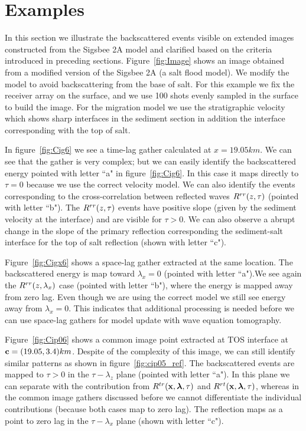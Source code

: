 \section{Examples}

In this section we illustrate the backscattered events visible on extended images constructed from the Sigsbee 2A model
and clarified based on the criteria introduced in preceding sections. Figure~\ref{fig:Image} shows an image obtained from  a modified
version of the Sigsbee 2A (a salt flood model). We modify the model to avoid backscattering from the base 
of salt. For this example we fix the receiver array on the surface, and we use 100 shots evenly sampled in the surface to build 
the image. For the migration model we use the stratigraphic
velocity which shows sharp interfaces in the sediment section in addition the interface corresponding with the top of salt.

In figure~\ref{fig:Cig6} we see a time-lag gather calculated at $x=19.05km$.
We can see that the gather is very complex; but we can easily identify the backscattered energy pointed with letter ``a" in figure~\ref{fig:Cig6}.
 In this case it maps directly to $\tau=0$ because we use the correct velocity model.
We can also identify the events corresponding to the cross-correlation between reflected waves $R^{rr}(z,\tau)$ (pointed
with letter ``b"). The $R^{rr}(z,\tau)$ events have positive slope (given by the sediment velocity at the interface) and are 
visible for $\tau>0$. We can also observe a abrupt change
in the slope of the primary reflection corresponding the sediment-salt interface for the top of salt reflection (shown with
letter ``c").

Figure~\ref{fig:Cigx6} shows a space-lag gather extracted at the same location. The backscattered energy is map toward $\lambda_x=0$ (pointed with 
letter ``a").We see again the $R^{rr}(z,\lambda_x)$ case (pointed with letter ``b"), where the energy is mapped away from zero lag.  
Even though we are using the correct model 
we still see energy away from $\lambda_x=0$. This indicates that additional processing is needed before 
we can use space-lag gathers for model update with wave equation tomography.

Figure~\ref{fig:Cip06} shows a common image point extracted at TOS interface at ${\bf c}=(19.05,3.4)km$. Despite of the complexity of this image, we can still
identify similar patterns as shown in figure~\ref{fig:cip05_ref}. The backscattered events are mapped to $\tau>0$ in the
$\tau-\lambda_z$ plane (pointed with letter ``a"). In this plane we can separate with the contribution 
from $R^{tr}({\bf x},{\boldsymbol{\lambda}},\tau)$ and $R^{rt}({\bf x},{\boldsymbol{\lambda}},\tau)$, whereas in the common image gathers discussed before we cannot differentiate the individual
contributions (because both cases map to zero lag). The reflection maps as a point to zero lag in the $\tau-\lambda_x$ plane (shown with letter ``c"). 


